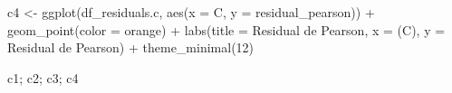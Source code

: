 \documentclass[
  letterpaper,
  DIV=11,
  numbers=noendperiod]{scrartcl}
\newenvironment{Shaded}{\begin{snugshade}}{\end{snugshade}}
\newcommand{\AttributeTok}[1]{\textcolor[rgb]{0.40,0.45,0.13}{#1}}
\newcommand{\DecValTok}[1]{\textcolor[rgb]{0.68,0.00,0.00}{#1}}
\newcommand{\FunctionTok}[1]{\textcolor[rgb]{0.28,0.35,0.67}{#1}}
\newcommand{\NormalTok}[1]{\textcolor[rgb]{0.00,0.23,0.31}{#1}}
\newcommand{\OtherTok}[1]{\textcolor[rgb]{0.00,0.23,0.31}{#1}}
\newcommand{\SpecialCharTok}[1]{\textcolor[rgb]{0.37,0.37,0.37}{#1}}
\newcommand{\StringTok}[1]{\textcolor[rgb]{0.13,0.47,0.30}{#1}}
\begin{document}
\begin{Shaded}
\begin{Highlighting}[]
\NormalTok{c4 }\OtherTok{\textless{}{-}} \FunctionTok{ggplot}\NormalTok{(df\_residuals.c, }\FunctionTok{aes}\NormalTok{(}\AttributeTok{x =}\NormalTok{ C, }\AttributeTok{y =}\NormalTok{ residual\_pearson)) }\SpecialCharTok{+}
    \FunctionTok{geom\_point}\NormalTok{(}\AttributeTok{color =} \StringTok{\textquotesingle{}orange\textquotesingle{}}\NormalTok{) }\SpecialCharTok{+}
    \FunctionTok{labs}\NormalTok{(}\AttributeTok{title =} \StringTok{\textquotesingle{}Residual de Pearson\textquotesingle{}}\NormalTok{, }\AttributeTok{x =} \StringTok{\textquotesingle{}(C)\textquotesingle{}}\NormalTok{, }\AttributeTok{y =} \StringTok{\textquotesingle{}Residual de Pearson\textquotesingle{}}\NormalTok{) }\SpecialCharTok{+}
    \FunctionTok{theme\_minimal}\NormalTok{(}\DecValTok{12}\NormalTok{)}
\end{Highlighting}
\end{Shaded}

\begin{Shaded}
\begin{Highlighting}[]
\NormalTok{c1; c2; c3; c4}
\end{Highlighting}
\end{Shaded}
\end{document}
